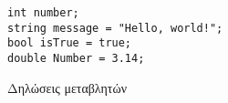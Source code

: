 \begin{listing}[htbp]
\begin{verbatim}
int number;
string message = "Hello, world!";
bool isTrue = true;
double Number = 3.14;
\end{verbatim}
\caption{Δηλώσεις μεταβλητών}
\label{flagExec}
\end{listing}